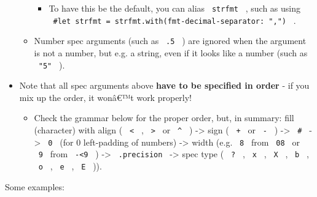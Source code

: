 \begin{itemize}
\begin{itemize}
    \begin{itemize}
    \tightlist
    \item
      To have this be the default, you can alias \texttt{\ strfmt\ } ,
      such as using
      \texttt{\ \#let\ strfmt\ =\ strfmt.with(fmt-decimal-separator:\ ",")\ }
      .
    \end{itemize}
  \item
    Number spec arguments (such as \texttt{\ .5\ } ) are ignored when
    the argument is not a number, but e.g. a string, even if it looks
    like a number (such as \texttt{\ "5"\ } ).
  \end{itemize}
\item
  Note that all spec arguments above \textbf{have to be specified in
  order} - if you mix up the order, it wonâ€™t work properly!

  \begin{itemize}
  \tightlist
  \item
    Check the grammar below for the proper order, but, in summary: fill
    (character) with align ( \texttt{\ \textless{}\ } ,
    \texttt{\ \textgreater{}\ } or \texttt{\ \^{}\ } ) -\textgreater{}
    sign ( \texttt{\ +\ } or \texttt{\ -\ } ) -\textgreater{}
    \texttt{\ \#\ } -\textgreater{} \texttt{\ 0\ } (for 0 left-padding
    of numbers) -\textgreater{} width (e.g. \texttt{\ 8\ } from
    \texttt{\ 08\ } or \texttt{\ 9\ } from \texttt{\ -\textless{}9\ } )
    -\textgreater{} \texttt{\ .precision\ } -\textgreater{} spec type (
    \texttt{\ ?\ } , \texttt{\ x\ } , \texttt{\ X\ } , \texttt{\ b\ } ,
    \texttt{\ o\ } , \texttt{\ e\ } , \texttt{\ E\ } )).
  \end{itemize}
\end{itemize}

Some examples:

\begin{Shaded}
\begin{Highlighting}[]



\end{Highlighting}
\end{Shaded}

